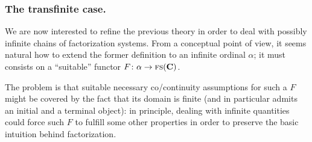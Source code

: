 \subsubsection{The transfinite case.}\label{transfinite.case} We are now interested to refine the previous theory in order to deal with possibly infinite chains of factorization systems. From a conceptual point of view, it seems natural how to extend the former definition to an infinite ordinal $\alpha$; it must consists on a ``suitable'' functor $F\colon \alpha\to \textsc{fs}(\mathbf{C})$. 

The problem is that suitable necessary co\fshyp{}continuity assumptions for such a $F$ might be covered by the fact that its domain is finite (and in particular admits an initial and a terminal object): in principle, dealing with infinite quantities could force such $F$ to fulfill some other properties in order to preserve the basic intuition behind factorization.

